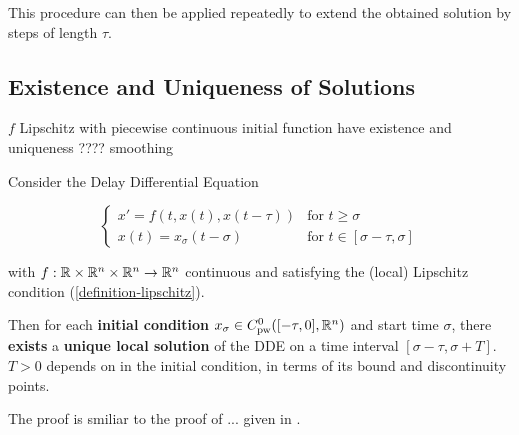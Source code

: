 \documentclass[10pt]{article}
\begin{document}
This procedure can then be applied repeatedly to extend the obtained solution by steps of length $\tau$.

\subsection{Existence and Uniqueness of Solutions} \label{existence-and-uniqueness-of-solutions}

$f$ Lipschitz with piecewise continuous initial function have existence and uniqueness ???? smoothing

\begin{theorem}
    \label{theorem-solution-existence}
    Consider the Delay Differential Equation



    \begin{equation}
        \begin{cases}
            x' = f(t,x(t),x(t-\tau)) & \text{for } t\geq\sigma\\
            x(t) = x_\sigma(t-\sigma)     & \text{for } t\in [\sigma-\tau,\sigma]
        \end{cases}
    \end{equation}

    with $f:\mathbb{R}\times\mathbb{R}^n\times\mathbb{R}^n\rightarrow\mathbb{R}^n$ continuous and satisfying the (local) Lipschitz condition (\ref{definition-lipschitz}).

    Then for each \textbf{initial condition} $x_\sigma\in C^0_\text{pw}([-\tau,0],\mathbb{R}^n)$ and start time $\sigma$, there \textbf{exists} a \textbf{unique local solution} of the DDE on a time interval $[\sigma-\tau, \sigma+T]$. $T>0$ depends on in the initial condition, in terms of its bound and discontinuity points.
\end{theorem}
The proof is smiliar to the proof of ... given in \cite{smith2010introDDE}.
\end{document}
